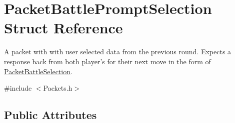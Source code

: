 \hypertarget{struct_packet_battle_prompt_selection}{\section{Packet\-Battle\-Prompt\-Selection Struct Reference}
\label{struct_packet_battle_prompt_selection}
}


A packet with with user selected data from the previous round. Expects a response back from both player's for their next move in the form of \hyperlink{struct_packet_battle_selection}{Packet\-Battle\-Selection}.  




{\ttfamily \#include $<$Packets.\-h$>$}

\subsection*{Public Attributes}
